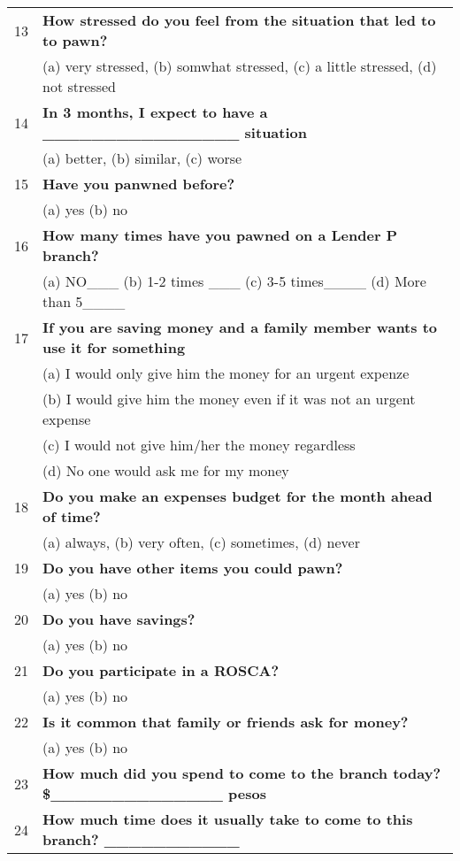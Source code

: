 \begin{tabular}{cl}
13    & \textbf{How stressed do you feel from the situation that led to to pawn?} \\
      & (a) very stressed, (b) somwhat stressed, (c) a little stressed, (d) not stressed  \\
14    & \textbf{In 3 months, I expect to have a  \_\_\_\_\_\_\_\_\_\_\_\_\_\_\_\_ situation} \\
      & (a) better, (b) similar,  (c) worse \\
15    & \textbf{Have you panwned before?} \\
      & (a) yes  (b) no \\
16    & \textbf{How many times have you pawned on a Lender P branch?} \\
      & (a) NO\_\_\_    (b)  1-2 times \_\_\_    (c) 3-5 times\_\_\_\_   (d) More than 5\_\_\_\_ \\
17    & \textbf{If you are saving money and a family member wants to use it for something } \\
      & (a) I would only give him the money for an urgent expenze \\
      & (b) I would give him the money even if it was not an urgent expense \\
      & (c) I would not give him/her the money regardless \\
      & (d) No one would ask me for my money \\
18    & \textbf{Do you make an expenses budget for the month ahead of time?} \\
      & (a) always, (b) very often, (c) sometimes, (d) never \\
19    & \textbf{Do you have other items you could pawn?} \\
      & (a) yes  (b) no \\
20    & \textbf{Do you have savings?} \\
      & (a) yes  (b) no \\
21    & \textbf{Do you participate in a ROSCA?} \\
      & (a) yes  (b) no \\
22    & \textbf{Is it common that family or friends ask for money?} \\
      & (a) yes  (b) no \\
23    & \textbf{How much did you spend to come to the branch today?    \$\_\_\_\_\_\_\_\_\_\_\_\_\_\_ pesos} \\
24    & \textbf{How much time does it usually take to come to this branch?    \_\_\_\_\_\_\_\_\_\_\_} \\

\end{tabular}
